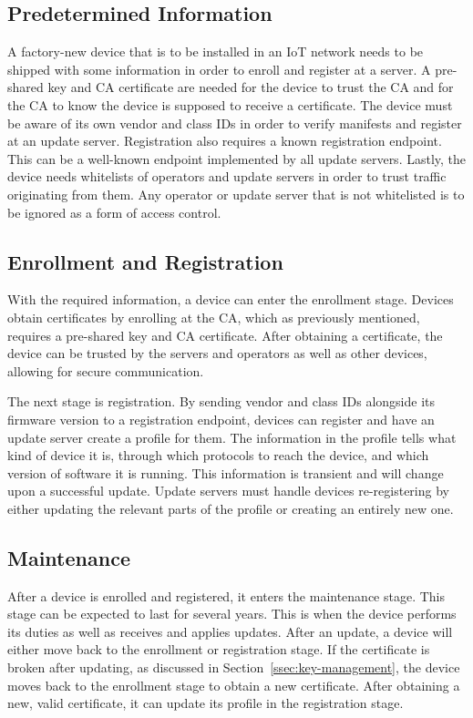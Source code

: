 \documentclass[0-thesis.tex]{subfiles}
\begin{document}
\subsection{Predetermined Information}
\label{ssec:predetermined-information}
A factory-new device that is to be installed in an IoT network needs to be shipped with
some information in order to enroll and register at a server. A pre-shared key and CA
certificate are needed for the device to trust the CA and for the CA to know the device is
supposed to receive a certificate. The device must be aware of its own vendor and class
IDs in order to verify manifests and register at an update server. Registration also
requires a known registration endpoint. This can be a well-known endpoint implemented by
all update servers. Lastly, the device needs whitelists of operators and update servers in
order to trust traffic originating from them. Any operator or update server that is not
whitelisted is to be ignored as a form of access control.

\subsection{Enrollment and Registration}
\label{ssec:enrollment-registration}
With the required information, a device can enter the enrollment stage. Devices obtain
certificates by enrolling at the CA, which as previously mentioned, requires a pre-shared
key and CA certificate. After obtaining a certificate, the device can be trusted by the
servers and operators as well as other devices, allowing for secure communication.

The next stage is registration. By sending vendor and class IDs alongside its firmware
version to a registration endpoint, devices can register and have an update server create
a profile for them. The information in the profile tells what kind of device it is,
through which protocols to reach the device, and which version of software it is running.
This information is transient and will change upon a successful update. Update servers
must handle devices re-registering by either updating the relevant parts of the profile or
creating an entirely new one.

\subsection{Maintenance}
\label{ssec:maintenance}
After a device is enrolled and registered, it enters the maintenance stage. This stage can
be expected to last for several years. This is when the device performs its duties as well
as receives and applies updates. After an update, a device will either move back to the
enrollment or registration stage. If the certificate is broken after updating, as
discussed in Section~\ref{ssec:key-management}, the device moves back to the enrollment
stage to obtain a new certificate. After obtaining a new, valid certificate, it can update
its profile in the registration stage. 
\end{document}
